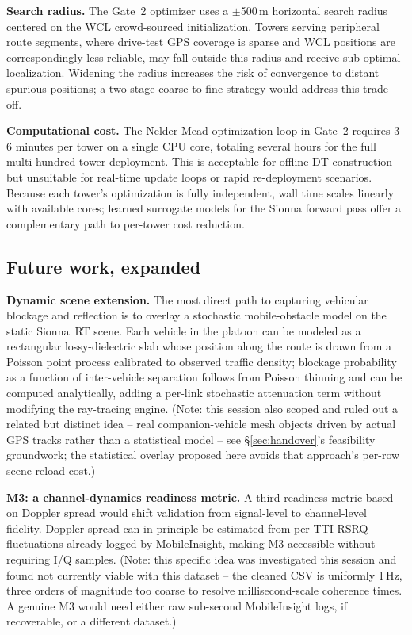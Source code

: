 \documentclass[11pt]{article}
\begin{document}
\textbf{Search radius.} The Gate~2 optimizer uses a $\pm$500\,m
horizontal search radius centered on the WCL crowd-sourced
initialization. Towers serving peripheral route segments, where
drive-test GPS coverage is sparse and WCL positions are correspondingly
less reliable, may fall outside this radius and receive sub-optimal
localization. Widening the radius increases the risk of convergence to
distant spurious positions; a two-stage coarse-to-fine strategy would
address this trade-off.

\textbf{Computational cost.} The Nelder-Mead optimization loop in
Gate~2 requires 3--6 minutes per tower on a single CPU core, totaling
several hours for the full multi-hundred-tower deployment. This is
acceptable for offline DT construction but unsuitable for real-time
update loops or rapid re-deployment scenarios. Because each tower's
optimization is fully independent, wall time scales linearly with
available cores; learned surrogate models for the Sionna forward pass
offer a complementary path to per-tower cost reduction.

\subsection{Future work, expanded}

\textbf{Dynamic scene extension.} The most direct path to capturing
vehicular blockage and reflection is to overlay a stochastic
mobile-obstacle model on the static Sionna~RT scene. Each vehicle in
the platoon can be modeled as a rectangular lossy-dielectric slab whose
position along the route is drawn from a Poisson point process
calibrated to observed traffic density; blockage probability as a
function of inter-vehicle separation follows from Poisson thinning and
can be computed analytically, adding a per-link stochastic attenuation
term without modifying the ray-tracing engine. (Note: this session also
scoped and ruled out a related but distinct idea -- real companion-vehicle
mesh objects driven by actual GPS tracks rather than a statistical
model -- see \S\ref{sec:handover}'s feasibility groundwork; the
statistical overlay proposed here avoids that approach's per-row
scene-reload cost.)

\textbf{M3: a channel-dynamics readiness metric.} A third readiness
metric based on Doppler spread would shift validation from signal-level
to channel-level fidelity. Doppler spread can in principle be estimated
from per-TTI RSRQ fluctuations already logged by MobileInsight, making
M3 accessible without requiring I/Q samples. (Note: this specific idea
was investigated this session and found not currently viable with this
dataset -- the cleaned CSV is uniformly 1\,Hz, three orders of magnitude
too coarse to resolve millisecond-scale coherence times. A genuine M3
would need either raw sub-second MobileInsight logs, if recoverable, or
a different dataset.)
\end{document}
